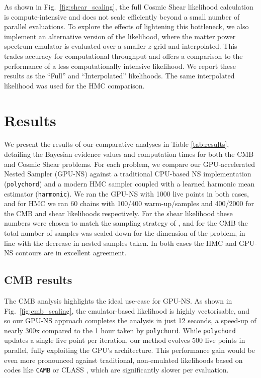 \documentclass[twocolumn]{openjournal}
\begin{document}
As shown in Fig.~\ref{fig:shear_scaling}, the full Cosmic Shear likelihood calculation is compute-intensive and does not scale efficiently beyond a small number of parallel evaluations. To explore the effects of lightening this bottleneck, we also implement an alternative version of the likelihood, where the matter power spectrum emulator is evaluated over a smaller $z$-grid and interpolated. This trades accuracy for computational throughput and offers a comparison to the performance of a less computationally intensive likelihood. We report these results as the ``Full'' and ``Interpolated'' likelihoods. The same interpolated likelihood was used for the HMC comparison.

\section{Results}
\label{sec:results}
We present the results of our comparative analyses in Table \ref{tab:results}, detailing the Bayesian evidence values and computation times for both the CMB and Cosmic Shear problems. For each problem, we compare our GPU-accelerated Nested Sampler (GPU-NS) against a traditional CPU-based NS implementation (\texttt{polychord}) and a modern HMC sampler coupled with a learned harmonic mean estimator (\texttt{harmonic}). We ran the GPU-NS with 1000 live points in both cases, and for HMC we ran 60 chains with 100/400 warm-up/samples and 400/2000 for the CMB and shear likelihoods respectively. For the shear likelihood these numbers were chosen to match the sampling strategy of \cite{Piras_2024}, and for the CMB the total number of samples was scaled down for the dimension of the problem, in line with the decrease in nested samples taken. In both cases the HMC and GPU-NS contours are in excellent agreement.

\subsection{CMB results}

The CMB analysis highlights the ideal use-case for GPU-NS. As shown in Fig.~\ref{fig:cmb_scaling}, the emulator-based likelihood is highly vectorisable, and so our GPU-NS approach completes the analysis in just 12 seconds, a speed-up of nearly 300x compared to the 1 hour taken by \texttt{polychord}. While \texttt{polychord} updates a single live point per iteration, our method evolves 500 live points in parallel, fully exploiting the GPU's architecture. This performance gain would be even more pronounced against traditional, non-emulated likelihoods based on codes like \texttt{CAMB} \citep{Lewis11} or CLASS \citep{Diego_Blas_2011}, which are significantly slower per evaluation.
\end{document}
